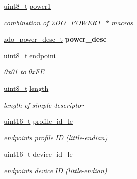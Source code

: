 \begin{DoxyCompactItemize}
\hyperlink{group__hal__dos_gae1affc9ca37cfb624959c866a73f83c2}{uint8\+\_\+t} \hyperlink{group__zdo_gae224a557c1b34dee80aabadd7de67437}{power1}
\begin{DoxyCompactList}\small\item\em combination of Z\+D\+O\+\_\+\+P\+O\+W\+E\+R1\+\_\+$\ast$ macros \end{DoxyCompactList}\item 
\mbox{\label{group__zdo_ga860c2f178dcb30cb0b76d8553ce4a043}} 
\hyperlink{group__zdo_ga38f8a530fcbd8b3be41f9026c1b95b70}{zdo\+\_\+power\+\_\+desc\+\_\+t} {\bfseries power\+\_\+desc}
\item 
\mbox{\label{group__zdo_ga7d397493728da2bca8d55b2d61c4ec5d}} 
\hyperlink{group__hal__dos_gae1affc9ca37cfb624959c866a73f83c2}{uint8\+\_\+t} \hyperlink{group__zdo_ga7d397493728da2bca8d55b2d61c4ec5d}{endpoint}
\begin{DoxyCompactList}\small\item\em 0x01 to 0x\+FE \end{DoxyCompactList}\item 
\mbox{\label{group__zdo_gab2b3adeb2a67e656ff030b56727fd0ac}} 
\hyperlink{group__hal__dos_gae1affc9ca37cfb624959c866a73f83c2}{uint8\+\_\+t} \hyperlink{group__zdo_gab2b3adeb2a67e656ff030b56727fd0ac}{length}
\begin{DoxyCompactList}\small\item\em length of simple descriptor \end{DoxyCompactList}\item 
\mbox{\label{group__zdo_ga9f7e601c7386ae55f5e6d5ec558af125}} 
\hyperlink{group__hal__dos_ga5a8b2dc9e45a9ee81a94ef304fb62505}{uint16\+\_\+t} \hyperlink{group__zdo_ga9f7e601c7386ae55f5e6d5ec558af125}{profile\+\_\+id\+\_\+le}
\begin{DoxyCompactList}\small\item\em endpoint\textquotesingle{}s profile ID (little-\/endian) \end{DoxyCompactList}\item 
\mbox{\label{group__zdo_ga8c37f5aa38d2a7b85e35461b14d4560c}} 
\hyperlink{group__hal__dos_ga5a8b2dc9e45a9ee81a94ef304fb62505}{uint16\+\_\+t} \hyperlink{group__zdo_ga8c37f5aa38d2a7b85e35461b14d4560c}{device\+\_\+id\+\_\+le}
\begin{DoxyCompactList}\small\item\em endpoint\textquotesingle{}s device ID (little-\/endian) \end{DoxyCompactList}\item 

\end{DoxyCompactItemize}
